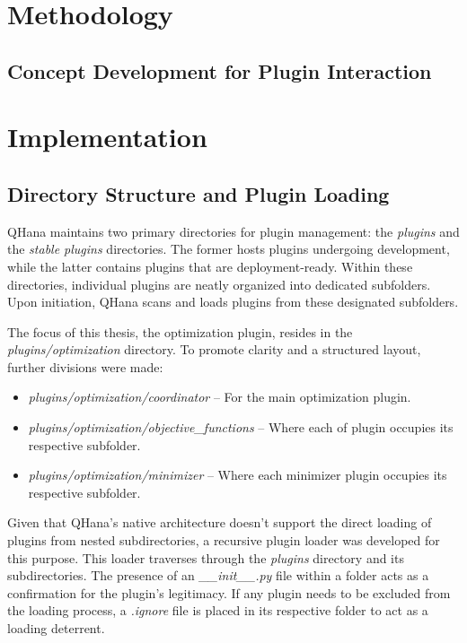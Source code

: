 \documentclass[
  a4paper,  %
  twoside,  %
  bibliography=totoc,
  headsepline,
  cleardoublepage=empty,
  parskip=half,
  draft=false
]{scrbook}
\begin{document}
\cite{Beisel2023} \cite{Beisel2023a} \cite{Thullier2021}

\chapter{Methodology}
\label{chap:methodology}
\section{Concept Development for Plugin Interaction}
\label{sec:conceptDevelopment}

\chapter{Implementation}
\label{chap:implementation}
\section{Directory Structure and Plugin Loading}
\label{sec:directoryStructure}

QHana maintains two primary directories for plugin management: the \textit{plugins} and the \textit{stable plugins} directories.
The former hosts plugins undergoing development, while the latter contains plugins that are deployment-ready.
Within these directories, individual plugins are neatly organized into dedicated subfolders.
Upon initiation, QHana scans and loads plugins from these designated subfolders.

The focus of this thesis, the optimization plugin, resides in the \textit{plugins/optimization} directory.
To promote clarity and a structured layout, further divisions were made:

\begin{itemize}
  \item \textit{plugins/optimization/coordinator} – For the main optimization plugin.
  \item \textit{plugins/optimization/objective\_functions} – Where each \gls{of} plugin occupies its respective subfolder.
  \item \textit{plugins/optimization/minimizer} – Where each minimizer plugin occupies its respective subfolder.
\end{itemize}

Given that QHana's native architecture doesn't support the direct loading of plugins from nested subdirectories, a recursive plugin loader was developed for this purpose.
This loader traverses through the \textit{plugins} directory and its subdirectories.
The presence of an \textit{\_\_init\_\_.py} file within a folder acts as a confirmation for the plugin's legitimacy.
If any plugin needs to be excluded from the loading process, a \textit{.ignore} file is placed in its respective folder to act as a loading deterrent.
\end{document}
